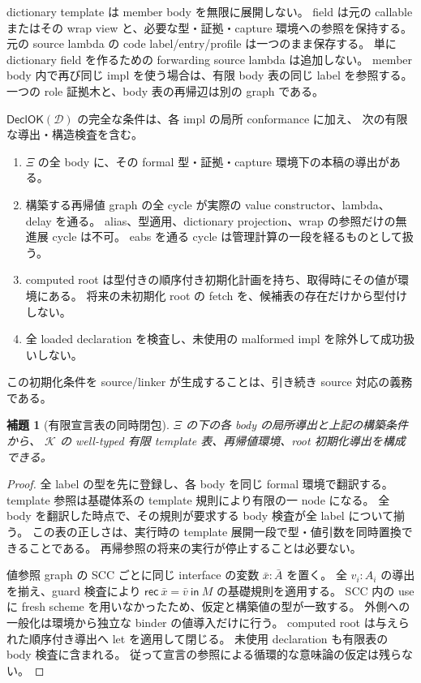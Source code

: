 \documentclass[11pt,a4paper]{article}
\newtheorem{lemma}[definition]{補題}
\newcommand{\Core}{\mathcal K}
\begin{document}
dictionary template は member body を無限に展開しない。
field は元の callable またはその wrap view と、必要な型・証拠・capture 環境への参照を保持する。
元の source lambda の code label/entry/profile は一つのまま保存する。
単に dictionary field を作るための forwarding source lambda は追加しない。
member body 内で再び同じ impl を使う場合は、有限 body 表の同じ label を参照する。
一つの role 証拠木と、body 表の再帰辺は別の graph である。

\(\mathsf{DeclOK}(\mathcal D)\) の完全な条件は、各 impl の局所 conformance に加え、
次の有限な導出・構造検査を含む。
\begin{enumerate}
\item \(\Xi\) の全 body に、その formal 型・証拠・capture 環境下の本稿の導出がある。
\item 構築する再帰値 graph の全 cycle が実際の value constructor、lambda、delay を通る。
      alias、型適用、dictionary projection、wrap の参照だけの無進展 cycle は不可。
      eabs を通る cycle は管理計算の一段を経るものとして扱う。
\item computed root は型付きの順序付き初期化計画を持ち、取得時にその値が環境にある。
      将来の未初期化 root の fetch を、候補表の存在だけから型付けしない。
\item 全 loaded declaration を検査し、未使用の malformed impl を除外して成功扱いしない。
\end{enumerate}
この初期化条件を source/linker が生成することは、引き続き source 対応の義務である。

\begin{lemma}[有限宣言表の同時閉包]
\(\Xi\) の下の各 body の局所導出と上記の構築条件から、
\(\Core\) の well-typed 有限 template 表、再帰値環境、root 初期化導出を構成できる。
\end{lemma}
\begin{proof}
全 label の型を先に登録し、各 body を同じ formal 環境で翻訳する。
template 参照は基礎体系の template 規則により有限の一 node になる。
全 body を翻訳した時点で、その規則が要求する body 検査が全 label について揃う。
この表の正しさは、実行時の template 展開一段で型・値引数を同時置換できることである。
再帰参照の将来の実行が停止することは必要ない。

値参照 graph の SCC ごとに同じ interface の変数 \(\bar x:\bar A\) を置く。
全 \(v_i:A_i\) の導出を揃え、guard 検査により
\(\mathsf{rec}\ \bar x=\bar v\ \mathsf{in}\ M\) の基礎規則を適用する。
SCC 内の use に fresh scheme を用いなかったため、仮定と構築値の型が一致する。
外側への一般化は環境から独立な binder の値導入だけに行う。
computed root は与えられた順序付き導出へ let を適用して閉じる。
未使用 declaration も有限表の body 検査に含まれる。
従って宣言の参照による循環的な意味論の仮定は残らない。
\end{proof}
\end{document}
